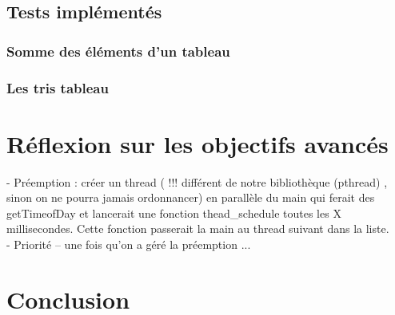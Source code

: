\documentclass[a4paper,12pt]{article}
\begin{document}
\subsection{Tests implémentés}
\subsubsection{Somme des éléments d'un tableau}
\subsubsection{Les tris tableau}

\clearpage
\section{Réflexion sur les objectifs avancés}
- Préemption : créer un thread ( !!! différent de notre bibliothèque (pthread) , sinon on ne pourra jamais ordonnancer) en parallèle du main qui ferait des getTimeofDay et lancerait une fonction thead\_schedule toutes les X millisecondes. Cette fonction passerait la main au thread suivant dans la liste.\\

- Priorité -- une fois qu'on a géré la préemption ...
\clearpage
\section{Conclusion}
\end{document}
